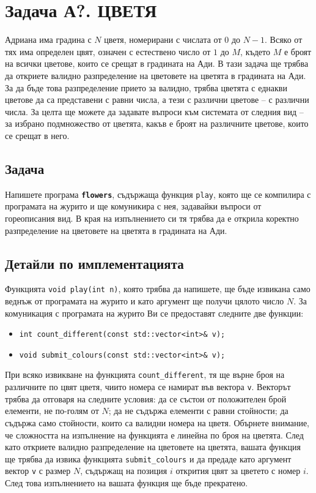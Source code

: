 \documentclass[12pt]{article}
\begin{document}
	
\section{Задача А?. ЦВЕТЯ}

Адриана има градина с $N$ цветя, номерирани с числата от $0$ до $N-1$. Всяко от тях има определен цвят, означен с естествено число от $1$ до $M$, където $M$ е броят на всички цветове, които се срещат в градината на Ади. В тази задача ще трябва да откриете валидно разпределение на цветовете на цветята в градината на Ади. За да бъде това разпределение прието за валидно, трябва цветята с еднакви цветове да са представени с равни числа, а тези с различни цветове – с различни числа. За целта ще можете да задавате въпроси към системата от следния вид – за избрано подмножество от цветята, какъв е броят на различните цветове, които се срещат в него.

\subsection{Задача}
Напишете програма \textbf{\texttt{flowers}}, съдържаща функция \texttt{play}, която ще се компилира с програмата на журито и ще комуникира с нея, задавайки въпроси от гореописания вид. В края на изпълнението си тя трябва да е открила коректно разпределение на цветовете на цветята в градината на Ади.

\subsection{Детайли по имплементацията}
Функцията \texttt{void play(int n)}, която трябва да напишете, ще бъде извикана само веднъж от програмата на журито и като аргумент ще получи цялото число $N$. За комуникация с програмата на журито Ви се предоставят следните две функции:

\begin{itemize}[label={}]
	\item \texttt{int count\_different(const std::vector<int>\& v);}
	\item \texttt{void submit\_colours(const std::vector<int>\& v);}
\end{itemize}

При всяко извикване на функцията \texttt{count\_different}, тя ще върне броя на различните по цвят цветя, чиито номера се намират във вектора \texttt{v}. Векторът трябва да отговаря на следните условия: да се състои от положителен брой елементи, не по-голям от $N$; да не съдържа елементи с равни стойности; да съдържа само стойности, които са валидни номера на цветя. Обърнете внимание, че сложността на изпълнение на функцията е линейна по броя на цветята. След като откриете валидно разпределение на цветовете на цветята, вашата функция ще трябва да извика функцията \texttt{submit\_colours} и да предаде като аргумент вектор \texttt{v} с размер $N$, съдържащ на позиция $i$ открития цвят за цветето с номер $i$. След това изпълнението на вашата функция ще бъде прекратено.
\end{document}
